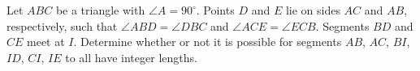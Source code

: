 Let $ABC$ be a triangle with $\angle A = 90^{\circ}$. Points $D$ and $E$ lie on sides $AC$ and $AB$,  respectively, such that $\angle ABD = \angle DBC$ and $\angle ACE = \angle ECB$. Segments $BD$ and $CE$ meet at $I$. Determine whether or not it is possible for segments $AB$,  $AC$,  $BI$,  $ID$,  $CI$,  $IE$ to all have integer lengths.